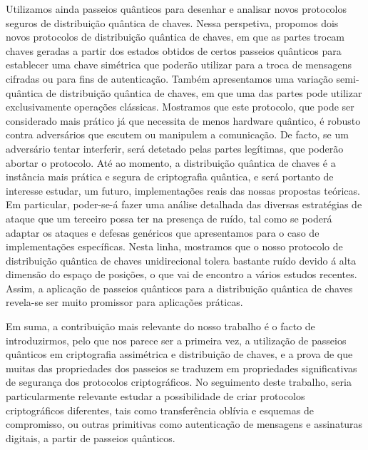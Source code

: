 \documentclass[11pt]{report}
\begin{document}
Utilizamos ainda passeios qu\^{a}nticos para desenhar e analisar novos protocolos seguros de distribui\c{c}\~{a}o qu\^{a}ntica de chaves. Nessa perspetiva, propomos dois novos protocolos de distribui\c{c}\~{a}o qu\^{a}ntica de chaves, em que as partes trocam chaves geradas a partir dos estados obtidos de certos passeios qu\^{a}nticos para establecer uma chave sim\'{e}trica que poder\~{a}o utilizar para a troca de mensagens cifradas ou para fins de autentica\c{c}\~{a}o. Tamb\'{e}m apresentamos uma varia\c{c}\~{a}o semi-qu\^{a}ntica de distribui\c{c}\~{a}o qu\^{a}ntica de chaves, em que uma das partes pode utilizar exclusivamente opera\c{c}\~{o}es cl\'{a}ssicas. Mostramos que este protocolo, que pode ser considerado mais pr\'{a}tico j\'{a} que necessita de menos hardware qu\^{a}ntico, \'{e} robusto contra advers\'{a}rios que escutem ou manipulem a comunica\c{c}\~{a}o. De facto, se um advers\'{a}rio tentar interferir, ser\'{a} detetado pelas partes leg\'{i}timas, que poder\~{a}o abortar o protocolo. At\'{e} ao momento, a distribui\c{c}\~{a}o qu\^{a}ntica de chaves \'{e} a instância mais pr\'{a}tica e segura de criptografia qu\^{a}ntica, e ser\'{a} portanto de interesse estudar, um futuro, implementa\c{c}\~{o}es reais das nossas propostas te\'{o}ricas. Em particular, poder-se-\'{a} fazer uma an\'{a}lise detalhada das diversas estrat\'{e}gias de ataque que um terceiro possa ter na presen\c{c}a de ru\'{i}do, tal como se poder\'{a} adaptar os ataques e defesas gen\'{e}ricos que apresentamos para o caso de implementa\c{c}\~{o}es espec\'{i}ficas. Nesta linha, mostramos que o nosso protocolo de distribui\c{c}\~{a}o qu\^{a}ntica de chaves unidirecional tolera bastante ru\'{i}do devido \'{a} alta dimens\~{a}o do espa\c{c}o de posi\c{c}\~{o}es, o que vai de encontro a v\'{a}rios estudos recentes. Assim, a aplica\c{c}\~{a}o de passeios qu\^{a}nticos para a distribui\c{c}\~{a}o qu\^{a}ntica de chaves revela-se ser muito promissor para aplica\c{c}\~{o}es pr\'{a}ticas.



Em suma, a contribui\c{c}\~{a}o mais relevante do nosso trabalho \'{e} o facto de introduzirmos, pelo que nos parece ser a primeira vez, a utiliza\c{c}\~{a}o de passeios qu\^{a}nticos em criptografia assim\'{e}trica e distribui\c{c}\~{a}o de chaves, e a prova de que muitas das propriedades dos passeios se traduzem em propriedades significativas de seguran\c{c}a dos protocolos criptogr\'{a}ficos. No seguimento deste trabalho, seria particularmente relevante estudar a possibilidade de criar protocolos criptogr\'{a}ficos diferentes, tais como transfer\^{e}ncia obl\'{i}via e esquemas de compromisso, ou outras primitivas como autentica\c{c}\~{a}o de mensagens e assinaturas digitais, a partir de passeios qu\^{a}nticos.
\end{document}
